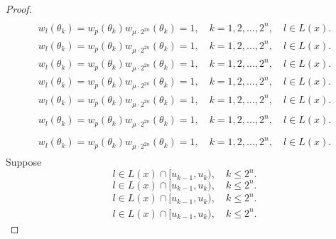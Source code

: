 \documentclass{amsart}
\numberwithin{equation}{section}
\begin{document}
\begin{proof}
{\begin{align*}
\end{align*}\fi   
{}\begin{align}\label{a14}
w_l(\theta_k)=w_p(\theta_k)w_{\mu\cdot 2^{2n}}(\theta_k)=1,\quad k=1,2,\ldots,2^n,\quad l\in L(x).
\end{align}\fi    
{}\begin{gather*}\label{a14}
w_l(\theta_k)=w_p(\theta_k)w_{\mu\cdot 2^{2n}}(\theta_k)=1,\quad k=1,2,\ldots,2^n,\quad l\in L(x).
\end{gather*}\fi  
{}\begin{gather}\label{a14}
w_l(\theta_k)=w_p(\theta_k)w_{\mu\cdot 2^{2n}}(\theta_k)=1,\quad k=1,2,\ldots,2^n,\quad l\in L(x).
\end{gather}\fi   
{}\begin{multline*}\label{a14}
w_l(\theta_k)=w_p(\theta_k)w_{\mu\cdot 2^{2n}}(\theta_k)=1,\quad k=1,2,\ldots,2^n,\quad l\in L(x).
\end{multline*}\fi  
{}\begin{multline}\label{a14}
w_l(\theta_k)=w_p(\theta_k)w_{\mu\cdot 2^{2n}}(\theta_k)=1,\quad k=1,2,\ldots,2^n,\quad l\in L(x).
\end{multline}\fi  
{}\begin{multline*}\begin{split}\label{a14}
w_l(\theta_k)=w_p(\theta_k)w_{\mu\cdot 2^{2n}}(\theta_k)=1,\quad k=1,2,\ldots,2^n,\quad l\in L(x).
\end{split}\end{multline*}\fi
{}\begin{multline}\begin{split}\label{a14}
w_l(\theta_k)=w_p(\theta_k)w_{\mu\cdot 2^{2n}}(\theta_k)=1,\quad k=1,2,\ldots,2^n,\quad l\in L(x).
\end{split}\end{multline}\fi
}
Suppose
{
\begin{equation*} \label{a16}
l\in L(x)\cap [u_{k-1},u_k),\quad k\le 2^n.
 \end{equation*}\fi  
{}\begin{equation}\label{a16}
l\in L(x)\cap [u_{k-1},u_k),\quad k\le 2^n.
\end{equation}\fi   
{}\begin{align*}\label{a16}
l\in L(x)\cap [u_{k-1},u_k),\quad k\le 2^n.
\end{align*}\fi   
{}\begin{align}\label{a16}
l\in L(x)\cap [u_{k-1},u_k),\quad k\le 2^n.
\end{align}\fi    
}
\end{proof}
\end{document}
